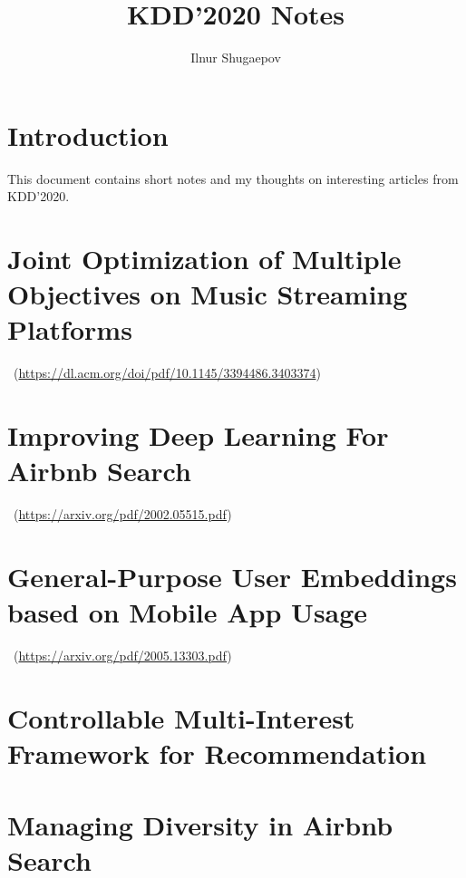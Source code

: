 \documentclass[runningheads,a4paper]{llncs}
\begin{document}
\mainmatter 

\title{KDD'2020 Notes}
\titlerunning{{}}
\author{Ilnur Shugaepov}
\authorrunning{{}}

\tocauthor{{}}

\maketitle


\medskip

\begingroup
\let\clearpage\relax
\tableofcontents
{}
\endgroup

\medskip
\medskip

\section*{Introduction}
This document contains short notes and my thoughts on interesting articles from KDD'2020.


\section{Joint Optimization of Multiple Objectives on Music Streaming Platforms}
\cite{rishabh2020multiobjective}~(\url{https://dl.acm.org/doi/pdf/10.1145/3394486.3403374})

\section{Improving Deep Learning For Airbnb Search}
\cite{haldar2020improving}~(\url{https://arxiv.org/pdf/2002.05515.pdf})

\section{General-Purpose User Embeddings based on Mobile App Usage}
\cite{zhang2020general}~(\url{https://arxiv.org/pdf/2005.13303.pdf})

\section{Controllable Multi-Interest Framework for Recommendation}

\section{Managing Diversity in Airbnb Search}
\end{document}
